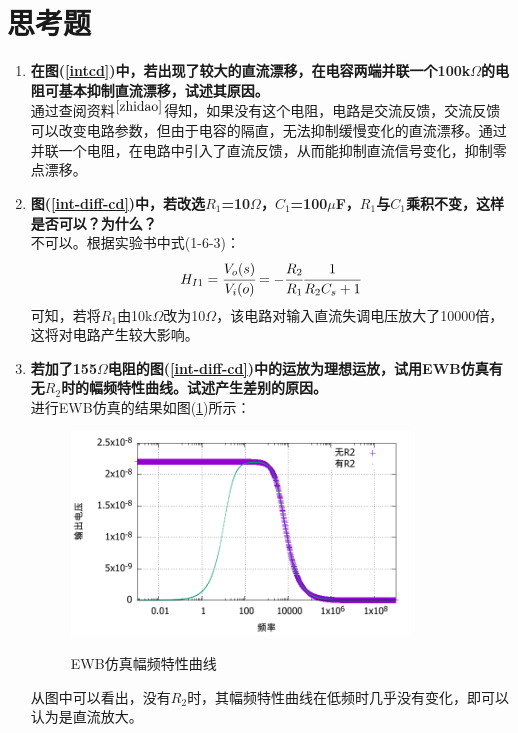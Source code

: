 \documentclass[a4paper]{article}
\begin{document}
\section{思考题}
\begin{enumerate}
\item \textbf{在图(\ref{intcd})中，若出现了较大的直流漂移，在电容两端并联一个100k$\Omega$的电阻可基本抑制直流漂移，试述其原因。}\\
通过查阅资料$^{\cite{zhidao}}$得知，如果没有这个电阻，电路是交流反馈，交流反馈可以改变电路参数，但由于电容的隔直，无法抑制缓慢变化的直流漂移。通过并联一个电阻，在电路中引入了直流反馈，从而能抑制直流信号变化，抑制零点漂移。
\item \textbf{图(\ref{int-diff-cd})中，若改选$R_1$=10$\Omega$，$C_1$=100$\mu$F，$R_1$与$C_1$乘积不变，这样是否可以？为什么？}\\
不可以。根据实验书中式(1-6-3)：
\begin{equation}
H_{I1} = \cfrac{V_o(s)}{V_i(o)} = -\cfrac{R_2}{R_1}\cfrac{1}{R_2C_s+1}\label{1-6-3}
\end{equation}
可知，若将$R_1$由10k$\Omega$改为10$\Omega$，该电路对输入直流失调电压放大了10000倍，这将对电路产生较大影响。
\item \textbf{若加了155$\Omega$电阻的图(\ref{int-diff-cd})中的运放为理想运放，试用EWB仿真有无$R_2$时的幅频特性曲线。试述产生差别的原因。}\\
进行EWB仿真的结果如图(\ref{EWB})所示：
\begin{figure}[!h]
\centering
\includegraphics[width=9cm]{fig/question4.pdf}\\
\caption{EWB仿真幅频特性曲线}\label{EWB}
\end{figure}

从图中可以看出，没有$R_2$时，其幅频特性曲线在低频时几乎没有变化，即可以认为是直流放大。
\end{enumerate}

\nocite{jiaocai}

\end{document}
